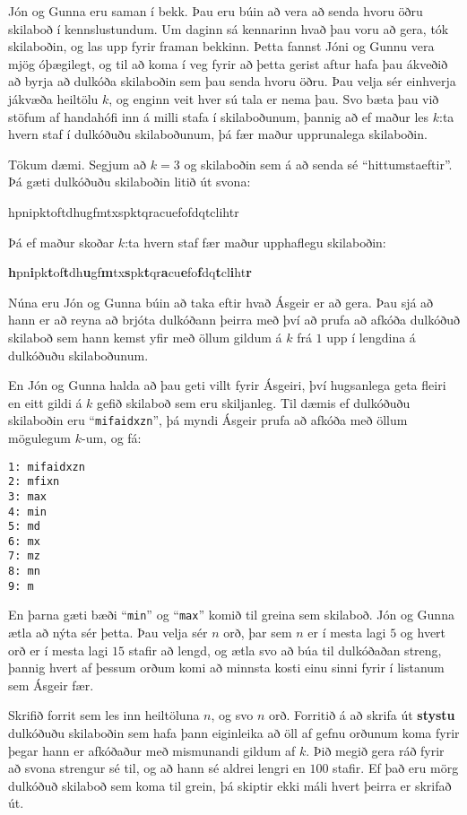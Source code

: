 

Jón og Gunna eru saman í bekk. Þau eru búin að vera að senda hvoru öðru
skilaboð í kennslustundum. Um daginn sá kennarinn hvað þau voru að gera, tók
skilaboðin, og las upp fyrir framan bekkinn. Þetta fannst Jóni og Gunnu vera
mjög óþægilegt, og til að koma í veg fyrir að þetta gerist aftur hafa þau
ákveðið að byrja að dulkóða skilaboðin sem þau senda hvoru öðru. Þau velja sér
einhverja jákvæða heiltölu $k$, og enginn veit hver sú tala er nema þau. Svo
bæta þau við stöfum af handahófi inn á milli stafa í skilaboðunum, þannig að ef
maður les $k$:ta hvern staf í dulkóðuðu skilaboðunum, þá fær maður upprunalega
skilaboðin.

Tökum dæmi. Segjum að $k=3$ og skilaboðin sem á að senda sé ``hittumstaeftir''. Þá gæti dulkóðuðu skilaboðin litið út svona:
\begin{center}
hpnipktoftdhugfmtxspktqracuefofdqtclihtr
\end{center}
Þá ef maður skoðar $k$:ta hvern staf fær maður upphaflegu skilaboðin:
\begin{center}
\textbf{h}pn\textbf{i}pk\textbf{t}of\textbf{t}dh\textbf{u}gf\textbf{m}tx\textbf{s}pk\textbf{t}qr\textbf{a}cu\textbf{e}fo\textbf{f}dq\textbf{t}cl\textbf{i}ht\textbf{r}
\end{center}


Núna eru Jón og Gunna búin að taka eftir hvað Ásgeir er að gera. Þau sjá að
hann er að reyna að brjóta dulkóðann þeirra með því að prufa að afkóða dulkóðuð
skilaboð sem hann kemst yfir með öllum gildum á $k$ frá $1$ upp í lengdina á
dulkóðuðu skilaboðunum.

En Jón og Gunna halda að þau geti villt fyrir Ásgeiri, því hugsanlega geta
fleiri en eitt gildi á $k$ gefið skilaboð sem eru skiljanleg. Til dæmis ef
dulkóðuðu skilaboðin eru ``\texttt{mifaidxzn}'', þá myndi Ásgeir prufa að
afkóða með öllum mögulegum $k$-um, og fá:

\begin{verbatim}
1: mifaidxzn
2: mfixn
3: max
4: min
5: md
6: mx
7: mz
8: mn
9: m
\end{verbatim}

En þarna gæti bæði ``\texttt{min}'' og ``\texttt{max}'' komið til greina sem
skilaboð. Jón og Gunna ætla að nýta sér þetta. Þau velja sér $n$ orð, þar sem
$n$ er í mesta lagi $5$ og hvert orð er í mesta lagi $15$ stafir að lengd, og
ætla svo að búa til dulkóðaðan streng, þannig hvert af þessum orðum komi að
minnsta kosti einu sinni fyrir í listanum sem Ásgeir fær.

Skrifið forrit sem les inn heiltöluna $n$, og svo $n$ orð. Forritið á að skrifa
út \textbf{stystu} dulkóðuðu skilaboðin sem hafa þann eiginleika að öll af
gefnu orðunum koma fyrir þegar hann er afkóðaður með mismunandi gildum af $k$.
Þið megið gera ráð fyrir að svona strengur sé til, og að hann sé aldrei lengri
en $100$ stafir. Ef það eru mörg dulkóðuð skilaboð sem koma til grein, þá
skiptir ekki máli hvert þeirra er skrifað út.

